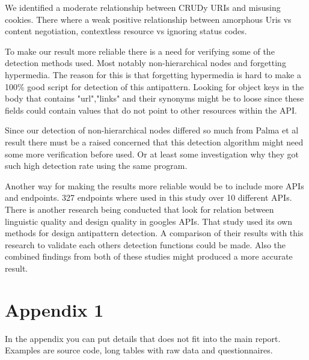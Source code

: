 \documentclass[a4paper,12pt]{article}
\begin{document}
We identified a moderate relationship between CRUDy URIs and misusing cookies. There where a weak positive relationship between amorphous Uris vs content negotiation, contextless resource vs ignoring status codes.

To make our result more reliable there is a need for verifying some of the detection methods used. Most notably non-hierarchical nodes and forgetting hypermedia. The reason for this is that forgetting hypermedia is hard to make a 100\% good script for detection of this antipattern. Looking for object keys in the body that contains "url","links" and their synonyms might be to loose since these fields could contain values that do not point to other resources within the API. 

Since our detection of non-hierarchical nodes differed so much from Palma et al\cite{linguistic} result there must be a raised concerned that this detection algorithm might need some more verification before used. Or at least some investigation why they got such high detection rate using the same program.

Another way for making the results more reliable would be to include more APIs and endpoints. 327 endpoints where used in this study over 10 different APIs. There is another research being conducted that look for relation between linguistic quality and design quality in googles APIs. That study used its own methods for design antipattern detection. A comparison of their results with this research to validate each others detection functions could be made. Also the combined findings from both of these studies might produced a more accurate result.

\newpage


%
\newpage


\hypersetup{urlcolor=black}


\newpage
\setcounter{page}{1} %
\appendix

\section{Appendix 1} 
In the appendix you can put details that does not fit into the main report. Examples are source code, long tables with raw data and questionnaires.
\end{document}
